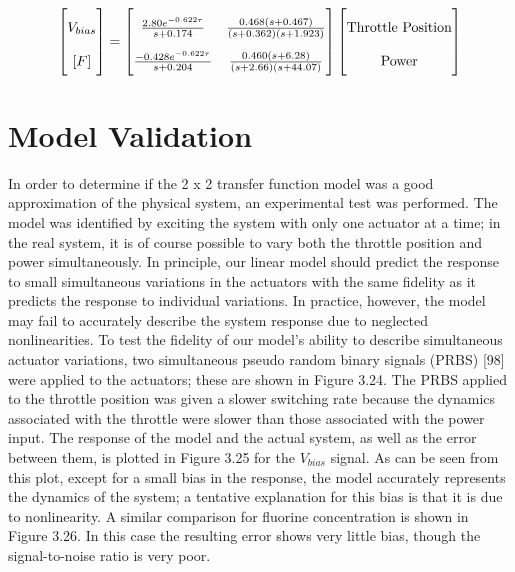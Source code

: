 \begin{align}
	\renewcommand\arraystretch{2} \begin{bmatrix} V_{bias} \\ [F] \end{bmatrix} = \begin{bmatrix} \frac{2.80e^{-0.622\tau}}{s+0.174} & \frac{0.468(s+0.467)}{(s+0.362)(s+1.923)} \\ \frac{-0.428e^{-0.622\tau}}{s+0.204} & \frac{0.460(s+6.28)}{(s+2.66)(s+44.07)}  \end{bmatrix} \begin{bmatrix} \text{Throttle Position} \\ \text{Power} \end{bmatrix}
\end{align}


\section{Model Validation}

\tab In order to determine if the 2 x 2 transfer function model was a good approximation of the physical system, an experimental test was performed. The model was identified by exciting the system with only one actuator at a time; in the real system, it is of course possible to vary both the throttle position and power simultaneously. In principle, our linear model should predict the response to small simultaneous variations in the actuators with the same fidelity as it predicts the response to individual variations. In practice, however, the model may fail to accurately describe the system response due to neglected nonlinearities. To test the fidelity of our model’s ability to describe simultaneous actuator variations, two simultaneous pseudo random binary signals (PRBS) [98] were applied to the actuators; these are shown in Figure 3.24. The PRBS applied to the throttle position was given a slower switching rate because the dynamics associated with the throttle were slower than those associated with the power input. The response of the model and the actual system, as well as the error between them, is plotted in Figure 3.25 for the $V_{bias}$ signal. As can be seen from this plot, except for a small bias in the response, the model accurately represents the dynamics of the system; a tentative explanation for this bias is that it is due to nonlinearity. A similar comparison for fluorine concentration is shown in Figure 3.26. In this case the resulting error shows very little bias, though the signal-to-noise ratio is very poor.

